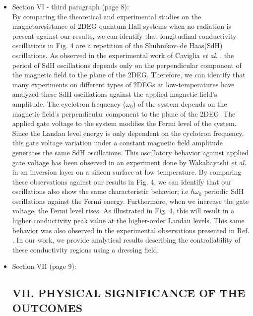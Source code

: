 \documentclass{article}
\begin{document}
\begin{itemize}
  \item Section VI - third paragraph (page 8):\\
  {\color{Red}
  By comparing the theoretical \cite{ando72,ando74_1,ando74_2,ando74_3,ando74_4,ando82,endo09} and experimental \cite{endo09,wakabayashi78,ochiai190,mancoff96,arapov02,grbic04,caviglia10} studies on the magnetoresistance of 2DEG quantum Hall systems when no radiation is present against our results, we can identify that longitudinal conductivity oscillations in Fig. 4 are a repetition of the Shubnikov–de Haas(SdH) oscillations.
  As observed in the experimental work of Caviglia \textit{et al.} \cite{caviglia10}, the period of SdH oscillations depends only on the perpendicular component of the magnetic field to the plane of the 2DEG.
  Therefore, we can identify that many experiments on different types of 2DEGs at low-temperatures \cite{endo09,ochiai190,mancoff96,arapov02,grbic04,caviglia10} have analyzed these SdH oscillations against the applied magnetic field's amplitude.
  The cyclotron frequency ($\omega_0$) of the system depends on the magnetic field's perpendicular component to the plane of the 2DEG.
  The applied gate voltage to the system modifies the Fermi level of the system.
  Since the Landau level energy is only dependent on the cyclotron frequency, this gate voltage variation under a constant magnetic field amplitude generates the same SdH oscillations.
  This oscillatory behavior against applied gate voltage has been observed in an  experiment done by Wakabayashi \textit{et al.} \cite{wakabayashi78} in an inversion layer on a silicon surface at low temperature.
  By comparing these observations against our results in Fig. 4, we can identify that our oscillations also show the same characteristic behavior; i.e  $\hbar\omega_0$ periodic SdH oscillations against the Fermi energy.
  Furthermore, when we increase the gate voltage, the Fermi level rises. As illustrated in Fig. 4, this will result in a higher conductivity peak value at the higher-order Landau levels. This same behavior was also observed in the experimental observations presented in Ref. \cite{wakabayashi78}.
  In our work, we provide analytical results describing the controllability of these conductivity regions using a dressing field.
  }
  \item Section VII (page 9):\\
  {\color{Red}
  \subsection*{VII. PHYSICAL SIGNIFICANCE OF THE OUTCOMES}

}
\end{itemize}
\end{document}
